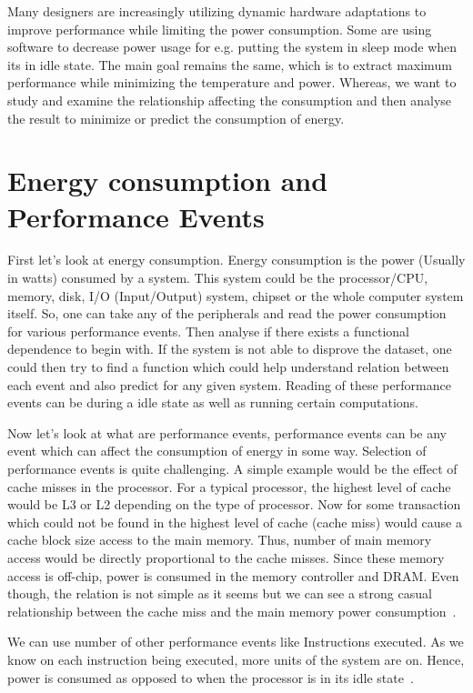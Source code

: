 Many designers are increasingly utilizing dynamic hardware adaptations to improve performance while limiting the power consumption. Some are using software to decrease power usage for e.g. putting the system in sleep mode when its in idle state. The main goal remains the same, which is to extract maximum performance while minimizing the temperature and power. Whereas, we want to study and examine the relationship affecting the consumption and then analyse the result to minimize or predict the consumption of energy.

\section{Energy consumption and Performance Events}

First let's look at energy consumption. Energy consumption is the power (Usually in watts) consumed by a system. This system could be the processor/CPU, memory, disk, I/O (Input/Output) system, chipset or the whole computer system itself. So, one can take any of the peripherals and read the power consumption for various performance events. Then analyse if there exists a functional dependence to begin with. If the system is not able to disprove the dataset, one could then try to find a function which could help understand relation between each event and also predict for any given system. Reading of these performance events can be during a idle state as well as running certain computations.

Now let's look at what are performance events, performance events can be any event which can affect the consumption of energy in some way. Selection of performance events is quite challenging. A simple example would be the effect of cache misses in the processor. For a typical processor, the highest level of cache would be L3 or L2 depending on the type of processor. Now for some transaction which could not be found in the highest level of cache (cache miss) would cause a cache block size access to the main memory. Thus, number of main memory access would be directly proportional to the cache misses. Since these memory access is off-chip, power is consumed in the memory controller and DRAM. Even though, the relation is not simple as it seems but we can see a strong casual relationship between the cache miss and the main memory power consumption~\cite{bircher2007complete}.

We can use number of other performance events like Instructions executed. As we know on each instruction being executed, more units of the system are on. Hence, power is consumed as opposed to when the processor is in its idle state~\cite{gilberto2005power}. 

